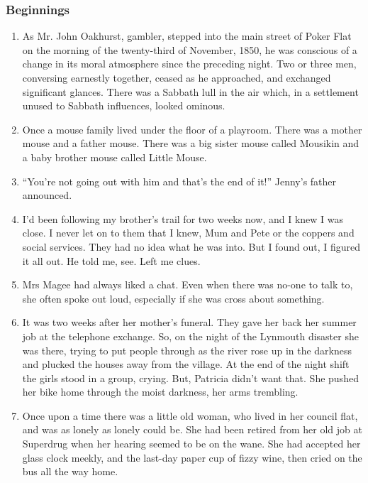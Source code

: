\documentclass[11pt]{article}
\begin{document}
\subsubsection*{Beginnings}
\begin{enumerate}
\item As Mr. John Oakhurst, gambler, stepped into the main street of Poker Flat on the morning of the twenty-third of November, 1850, he was conscious of a change in its moral atmosphere since the preceding night. Two or three men, conversing earnestly together, ceased as he approached, and exchanged significant glances. There was a Sabbath lull in the air which, in a settlement unused to Sabbath influences, looked ominous.
\item Once a mouse family lived under the floor of a playroom. There was a 
mother mouse and a father mouse. There was a big sister mouse called Mousikin
and a baby brother mouse called Little Mouse.


\item ``You're not going out with him and that's the end of it!'' Jenny's
father announced.


\item I'd been following my brother's trail for two weeks now, and I knew I was
close. I never let on to them that I knew, Mum and Pete or the coppers and
social services. They had no idea what he was into. But I found out, I
figured it all out. He told me, see. Left me clues.

\item Mrs Magee had always liked a chat. Even when there was no-one to talk
to, she often spoke out loud, especially if she was cross about something.

\item It was two weeks after her mother's funeral. They gave her back her summer
job at the telephone exchange. So, on the night of the Lynmouth disaster
she was there, trying to put people through as the river rose up in the
darkness and plucked the houses away from the village. At the end of the
night shift the girls stood in a group, crying. But, Patricia didn't want
that. She pushed her bike home through the moist darkness, her arms
trembling.


\item Once upon a time there was a little old woman, who lived in her council
flat, and was as lonely as lonely could be. She had been retired from her
old job at Superdrug when her hearing seemed to be on the wane. She had
accepted her glass clock meekly, and the last-day paper cup of fizzy wine,
then cried on the bus all the way home.


\end{enumerate}
\end{document}
